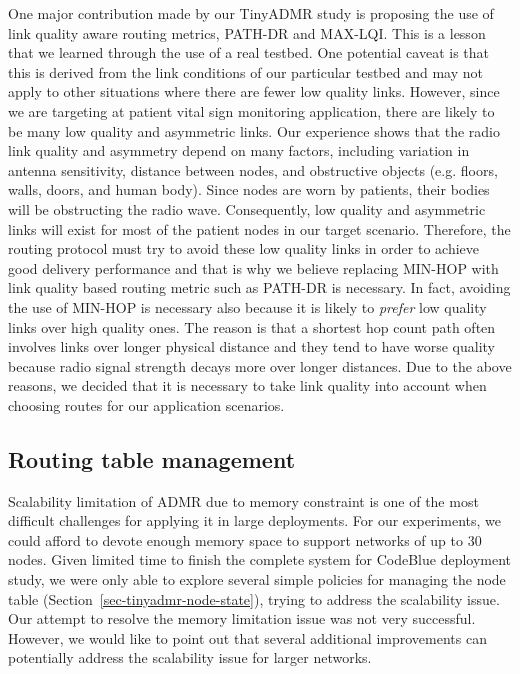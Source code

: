 One major contribution made by our TinyADMR study is proposing the use of link
quality aware routing metrics, PATH-DR and MAX-LQI. This is a lesson that we
learned through the use of a real testbed. One potential caveat 
is that this is derived from the link conditions of our particular testbed and
may not apply to other situations where there are fewer low quality links.
However, since we are targeting at patient vital sign monitoring application,
there are likely to be many low quality and asymmetric links.  Our experience
shows that the radio link quality and asymmetry depend on many factors,
including variation in antenna sensitivity, distance between nodes, and
obstructive objects (e.g. floors, walls, doors, and human body). Since nodes
are worn by patients, their bodies will be obstructing the radio wave.
Consequently, low quality and asymmetric links will exist for most of the
patient nodes in our target scenario. Therefore, the routing protocol must try
to avoid these low quality links in order to achieve good delivery performance
and that is why we believe replacing MIN-HOP with link quality based routing
metric such as PATH-DR is necessary. In fact, avoiding the use of MIN-HOP is
necessary also because it is likely to {\em prefer} low quality links over
high quality ones. The reason is that a shortest hop count path often involves
links over longer physical distance and they tend to have worse
quality because radio signal strength decays more over longer distances. Due
to the above reasons, we decided that it is necessary to take link quality
into account when choosing routes for our application scenarios.

\subsection{Routing table management}

Scalability limitation of ADMR due to memory constraint
is one of the most difficult challenges for applying it in large deployments.
For our experiments, we could afford to devote enough memory space to support
networks of up to 30 nodes. Given limited time to finish the complete system
for CodeBlue deployment study, we were only able to explore several simple
policies for managing the node table
(Section~\ref{sec-tinyadmr-node-state}), trying to address the scalability
issue. Our attempt to resolve the memory limitation issue was not very
successful. However, we would like to point out that several additional
improvements can
potentially address the scalability issue for larger networks. 

